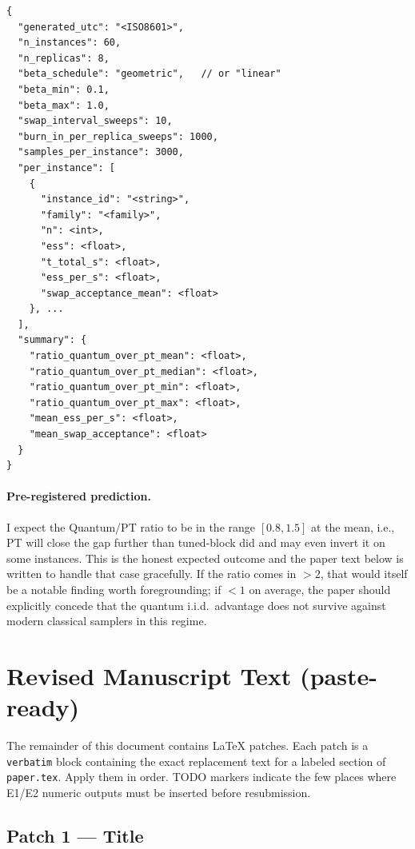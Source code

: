\begin{verbatim}
{
  "generated_utc": "<ISO8601>",
  "n_instances": 60,
  "n_replicas": 8,
  "beta_schedule": "geometric",   // or "linear"
  "beta_min": 0.1,
  "beta_max": 1.0,
  "swap_interval_sweeps": 10,
  "burn_in_per_replica_sweeps": 1000,
  "samples_per_instance": 3000,
  "per_instance": [
    {
      "instance_id": "<string>",
      "family": "<family>",
      "n": <int>,
      "ess": <float>,
      "t_total_s": <float>,
      "ess_per_s": <float>,
      "swap_acceptance_mean": <float>
    }, ...
  ],
  "summary": {
    "ratio_quantum_over_pt_mean": <float>,
    "ratio_quantum_over_pt_median": <float>,
    "ratio_quantum_over_pt_min": <float>,
    "ratio_quantum_over_pt_max": <float>,
    "mean_ess_per_s": <float>,
    "mean_swap_acceptance": <float>
  }
}
\end{verbatim}

\paragraph{Pre-registered prediction.}  I expect the Quantum/PT ratio to be
in the range $[0.8, 1.5]$ at the mean, i.e., PT will close the gap further
than tuned-block did and may even invert it on some instances.  This is the
honest expected outcome and the paper text below is written to handle that
case gracefully.  If the ratio comes in $> 2$, that would itself be a notable
finding worth foregrounding; if $< 1$ on average, the paper should explicitly
concede that the quantum i.i.d.\ advantage does not survive against modern
classical samplers in this regime.

\section{Revised Manuscript Text (paste-ready)}
\label{sec:revised-text}

The remainder of this document contains LaTeX patches.  Each patch is a
\verb|verbatim| block containing the exact replacement text for a labeled
section of \texttt{paper.tex}.  Apply them in order.  TODO markers indicate
the few places where E1/E2 numeric outputs must be inserted before
resubmission.

\subsection*{Patch 1 --- Title}

